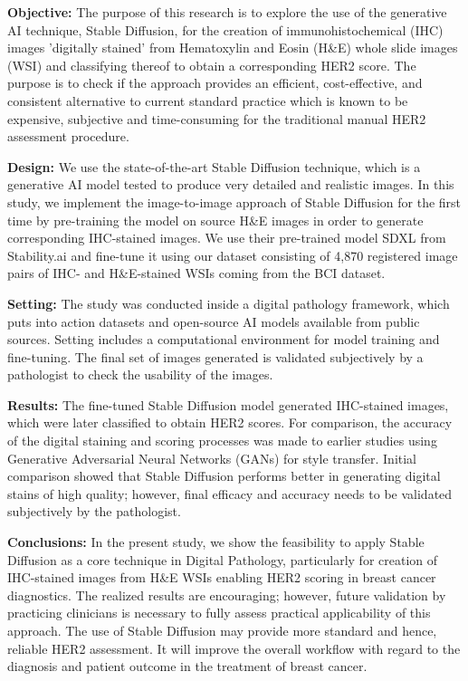 


\begin{abstracts}        %

\textbf{Objective: }The purpose of this research is to explore the use of the generative AI technique, Stable Diffusion, for the creation of immunohistochemical (IHC) images 'digitally stained' from Hematoxylin and Eosin (H\&E) whole slide images (WSI) and classifying thereof to obtain a corresponding HER2 score. The purpose is to check if the approach provides an efficient, cost-effective, and consistent alternative to current standard practice which is known to be expensive, subjective and time-consuming for the traditional manual HER2 assessment procedure.

\textbf{Design:} We use the state-of-the-art Stable Diffusion technique, which is a generative AI model tested to produce very detailed and realistic images. In this study, we implement the image-to-image approach of Stable Diffusion for the first time by pre-training the model on source H\&E images in order to generate corresponding IHC-stained images. We use their pre-trained model SDXL from Stability.ai and fine-tune it using our dataset consisting of 4,870 registered image pairs of IHC- and H\&E-stained WSIs coming from the BCI dataset.

\textbf{Setting:} The study was conducted inside a digital pathology framework, which puts into action datasets and open-source AI models available from public sources. Setting includes a computational environment for model training and fine-tuning. The final set of images generated is validated subjectively by a pathologist to check the usability of the images.

\textbf{Results:} The fine-tuned Stable Diffusion model generated IHC-stained images, which were later classified to obtain HER2 scores. For comparison, the accuracy of the digital staining and scoring processes was made to earlier studies using Generative Adversarial Neural Networks (GANs) for style transfer. Initial comparison showed that Stable Diffusion performs better in generating digital stains of high quality; however, final efficacy and accuracy needs to be validated subjectively by the pathologist.

\textbf{Conclusions:} In the present study, we show the feasibility to apply Stable Diffusion as a core technique in Digital Pathology, particularly for creation of IHC-stained images from H\&E WSIs enabling HER2 scoring in breast cancer diagnostics. The realized results are encouraging; however, future validation by practicing clinicians is necessary to fully assess practical applicability of this approach. The use of Stable Diffusion may provide more standard and hence, reliable HER2 assessment. It will improve the overall workflow with regard to the diagnosis and patient outcome in the treatment of breast cancer.


\end{abstracts}
